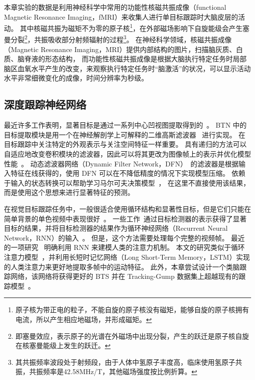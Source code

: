 本章实验的数据是利用神经科学中常用的功能性核磁共振成像（functional Magnetic Resonance Imaging，fMRI）来收集人进行单目标跟踪时大脑皮层的活动。
其中核磁共振为磁矩不为零的原子核\footnote{原子核为带正电的粒子，不能自旋的原子核没有磁矩，能够自旋的原子核拥有电流，所以产生相应地磁场，并形成磁矩。}，在外部磁场影响下自旋能级会产生塞曼分裂\footnote{即塞曼效应，表示原子的光谱在外磁场中出现分裂，产生的跃迁是原子核自旋在核塞曼能级上发生的跃迁。}，共振吸收部分射频辐射的过程\footnote{其共振频率波段处于射频段，由于人体中氢原子丰度高，临床使用氢原子共振，共振频率是42.58MHz/T，其他磁场强度按比例折算。}。
在神经科学领域，核磁共振成像（Magnetic Resonance Imaging，MRI）提供内部结构的图片，扫描脑灰质、白质、脑脊液的形态结构，
而功能性核磁共振成像是根据大脑执行特定任务时局部脑区血氧水平产生的改变，来观察执行特定任务时“脑激活”的状况，可以显示活动水平非常细微变化的成像，时间分辨率为秒级。

\subsection{深度跟踪神经网络}
最近许多工作表明，显著目标是通过一系列中心凹视图提取得到的~\cite{mnih2014recurrent,draw}。 
BTN 中的目标提取模块是用一个在神经解剖学上可解释的二维高斯滤波器~\cite{ratm} 进行实现。 
在目标跟踪中关注特定的外观表示与关注空间特征一样重要。 
具有递归的方法可以自适应地改变卷积模块的滤波器，因此可以将其更改为图像帧上的表示并优化模型性能~\cite{stollenga2014deep}。 
动态滤波器网络（Dynamic Filter Network，DFN）~\cite{brabandere2016dynamic}的滤波器是根据输入特征在线获得的，使用 DFN 可以在不降低精度的情况下实现模型压缩。
依赖于输入的状态转换可以帮助学习马尔可夫决策模型~\cite{karl2017deep}，
在这里不直接使用该结果，而是使用这个思想来进行显著特征的预测。

在视觉目标跟踪任务中，一般很适合使用循环结构和显著性目标，但是它们只能在简单背景的单色视频中表现很好~\cite{ratm}。
一些工作~\cite{ssrcnn}通过目标检测器的表示获得了显著目标的结果，并将目标检测器的结果作为循环神经网络（Recurrent Neural Network，RNN）的输入~\cite{su2020improved}。
但是，这个方法需要处理每个完整的视频帧。
最近的一项研究~\cite{gordon2017re3} 明确利用 RNN 来建模人类的注意力机制。
本文的研究类似于循环注意力模型~\cite{ratm}，并利用长短时记忆网络（Long Short-Term Memory，LSTM）实现的人类注意力来更好地提取多帧中的运动特征。
此外，本章尝试设计一个类脑跟踪网络，该网络将获得更好的 BTS 并在 Tracking-Gump 数据集上超越现有的跟踪模型~\cite{gaze_forrest}。



